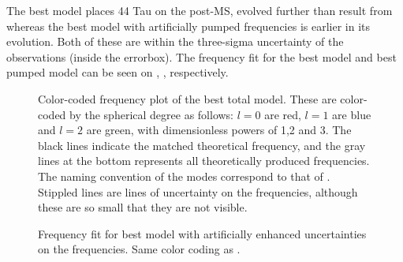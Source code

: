 The best model places 44 Tau on the post-MS, evolved further than result from \citet{lenz2010delta} whereas the best model with artificially pumped frequencies is earlier in its evolution. Both of these are within the three-sigma uncertainty of the observations (inside the errorbox). The frequency fit for the best model and best pumped model can be seen on , , respectively. 
 
 \begin{figure}[htbp]
 	\centering
 	\caption{Color-coded frequency plot of the best total model.  These are color-coded by the spherical degree as follows: $l=0$ are red, $l=1$ are blue and  $l=2$ are green, with dimensionless powers of 1,2 and 3. The black lines indicate the matched theoretical frequency, and the gray lines at the bottom represents all theoretically produced frequencies. The naming convention of the modes correspond to that of \citet{lenz2010delta}. Stippled lines are lines of uncertainty on the frequencies, although these are so small that they are not visible.}
 	\label{freqfitbest}
 \end{figure}
\begin{figure}[htbp]
	\centering
	\caption{Frequency fit for best model with artificially enhanced uncertainties on the frequencies. Same color coding as .}
	\label{freqfitpumped}
\end{figure}
 
